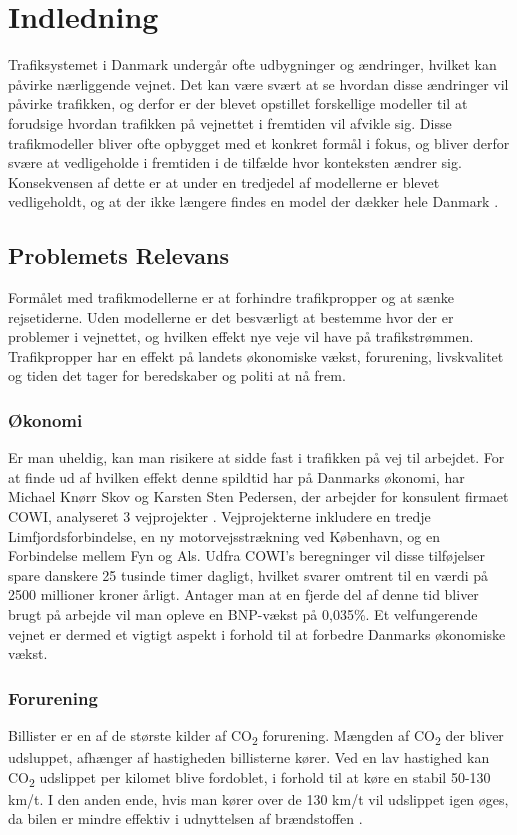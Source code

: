 \chapter{Indledning}\label{Indledning}
Trafiksystemet i Danmark undergår ofte udbygninger og ændringer, hvilket kan påvirke nærliggende vejnet. Det kan være svært at se hvordan disse ændringer vil påvirke trafikken, og derfor er der blevet opstillet forskellige modeller til at forudsige hvordan trafikken på vejnettet i fremtiden vil afvikle sig. Disse trafikmodeller bliver ofte opbygget med et konkret formål i fokus, og bliver derfor svære at vedligeholde i fremtiden i de tilfælde hvor konteksten ændrer sig. Konsekvensen af dette er at under en tredjedel af modellerne er blevet vedligeholdt, og at der ikke længere findes en model der dækker hele Danmark \cite[s. 1-2]{dtfnotat}.
\section{Problemets Relevans}
Formålet med trafikmodellerne er at forhindre trafikpropper og at sænke rejsetiderne. Uden modellerne er det besværligt at bestemme hvor der er problemer i vejnettet, og hvilken effekt nye veje vil have på trafikstrømmen. Trafikpropper har en effekt på landets økonomiske vækst, forurening, livskvalitet og tiden det tager for beredskaber og politi at nå frem.

\subsection{Økonomi}
Er man uheldig, kan man risikere at sidde fast i trafikken på vej til arbejdet. For at finde ud af hvilken effekt denne spildtid har på Danmarks økonomi, har Michael Knørr Skov og Karsten Sten Pedersen, der arbejder for konsulent firmaet COWI, analyseret 3 vejprojekter \cite{trafikoekonomi}. Vejprojekterne inkludere en tredje Limfjordsforbindelse, en ny motorvejsstrækning ved København, og en Forbindelse mellem Fyn og Als. Udfra COWI’s beregninger vil disse tilføjelser spare danskere 25 tusinde timer dagligt, hvilket svarer omtrent til en værdi på 2500 millioner kroner årligt. Antager man at en fjerde del af denne tid bliver brugt på arbejde vil man opleve en BNP-vækst på 0,035\%. Et velfungerende vejnet er dermed et vigtigt aspekt i forhold til at forbedre Danmarks økonomiske vækst. 

\subsection{Forurening}
Billister er en af de største kilder af CO\textsubscript{2} forurening. Mængden af CO\textsubscript{2} der bliver udsluppet, afhænger af hastigheden billisterne kører. Ved en lav hastighed kan CO\textsubscript{2} udslippet per kilomet blive fordoblet, i forhold til at køre en stabil 50-130 km/t. I den anden ende, hvis man kører over de 130 km/t vil udslippet igen øges, da bilen er mindre effektiv i udnyttelsen af brændstoffen \cite[s. 5-6]{forurening}.

